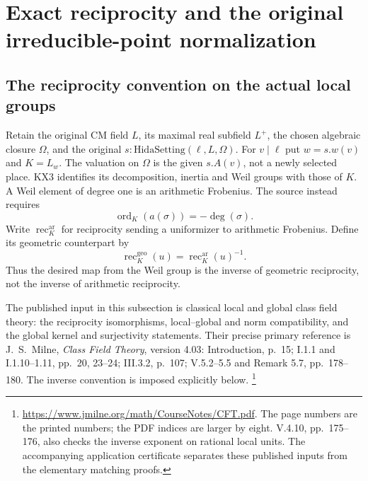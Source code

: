 \section{Exact reciprocity and the original irreducible-point normalization}
\label{sec:count-ii-producer}


\subsection{The reciprocity convention on the actual local groups}

Retain the original CM field $L$, its maximal real subfield $L^+$,
the chosen algebraic closure $\Omega$, and the original
$s:\mathrm{HidaSetting}(\ell,L,\Omega)$.  For $v\mid\ell$ put
$w=s.w(v)$ and $K=L_w$.  The valuation on $\Omega$ is the given
$s.A(v)$, not a newly selected place.  KX3 identifies its decomposition,
inertia and Weil groups with those of $K$.  A Weil element of degree
one is an arithmetic Frobenius.  The source instead requires
\[
 \operatorname{ord}_K(a(\sigma))=-\deg(\sigma).
 \tag{CIP.1}
\]
Write $\operatorname{rec}^{\mathrm{ar}}_K$ for reciprocity sending a
uniformizer to arithmetic Frobenius.  Define its geometric counterpart by
\[
 \operatorname{rec}^{\mathrm{geo}}_K(u)
       =\operatorname{rec}^{\mathrm{ar}}_K(u)^{-1}.
\]
Thus the desired map from the Weil group is the inverse of geometric
reciprocity, not the inverse of arithmetic reciprocity.

The published input in this subsection is classical local and global
class field theory: the reciprocity isomorphisms, local--global and
norm compatibility, and the global kernel and surjectivity statements.
Their precise primary reference is J.~S.~Milne,
\emph{Class Field Theory}, version 4.03:
Introduction, p.~15; I.1.1 and I.1.10--1.11, pp.~20, 23--24;
III.3.2, p.~107; V.5.2--5.5 and Remark 5.7, pp.~178--180.
The inverse convention is imposed explicitly below.
\footnote{\url{https://www.jmilne.org/math/CourseNotes/CFT.pdf}.
The page numbers are the printed numbers; the PDF indices are larger
by eight.  V.4.10, pp.~175--176, also checks the inverse exponent on
rational local units.  The accompanying application certificate
separates these published inputs from the elementary matching proofs.}

